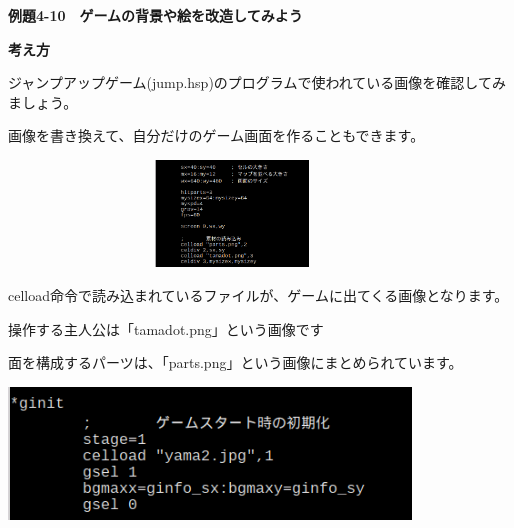 \documentclass[a4paper,dvipdfmx]{jarticle}
\newcommand\textstyleqwerty[1]{#1}
\begin{document}
\bigskip


\bigskip


\bigskip


\bigskip

\clearpage
\textstyleqwerty{\textbf{例題4-10　ゲームの背景や絵を改造してみよう}}


\bigskip

{\bfseries
考え方}


\bigskip

ジャンプアップゲーム(jump.hsp)のプログラムで使われている画像を確認してみましょう。

画像を書き換えて、自分だけのゲーム画面を作ることもできます。


\bigskip



\begin{center}
\includegraphics[width=11.853cm,height=2.842cm]{text04-img/text04-img026.png}

\end{center}

\bigskip


\bigskip


\bigskip


\bigskip


\bigskip


\bigskip


\bigskip


\bigskip

celload命令で読み込まれているファイルが、ゲームに出てくる画像となります。

操作する主人公は「tamadot.png」という画像です

面を構成するパーツは、「parts.png」という画像にまとめられています。


\bigskip



\begin{center}
\includegraphics[width=10.689cm,height=3.538cm]{text04-img/text04-img027.png}

\end{center}
\end{document}
